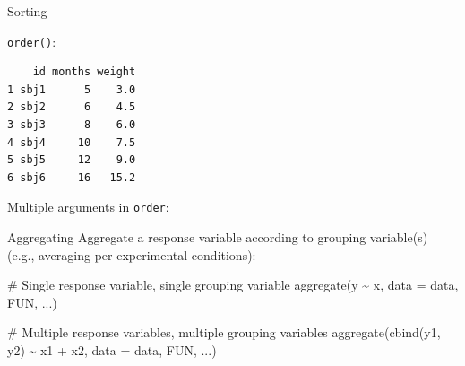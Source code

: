 \documentclass[
  ignorenonframetext,
]{beamer}
\newenvironment{Shaded}{\begin{snugshade}}{\end{snugshade}}
\newcommand{\AttributeTok}[1]{\textcolor[rgb]{0.00,0.34,0.68}{#1}}
\newcommand{\CommentTok}[1]{\textcolor[rgb]{0.54,0.53,0.53}{#1}}
\newcommand{\ConstantTok}[1]{\textcolor[rgb]{0.67,0.33,0.00}{#1}}
\newcommand{\FunctionTok}[1]{\textcolor[rgb]{0.39,0.29,0.61}{#1}}
\newcommand{\NormalTok}[1]{\textcolor[rgb]{0.12,0.11,0.11}{#1}}
\newcommand{\SpecialCharTok}[1]{\textcolor[rgb]{0.24,0.68,0.91}{#1}}
\begin{document}
\begin{frame}[fragile]{Sorting}
\protect\hypertarget{sorting}{}
\small

\texttt{order()}:

\begin{Shaded}
\end{Shaded}

\begin{verbatim}
    id months weight
1 sbj1      5    3.0
2 sbj2      6    4.5
3 sbj3      8    6.0
4 sbj4     10    7.5
5 sbj5     12    9.0
6 sbj6     16   15.2
\end{verbatim}

\begin{Shaded}
\end{Shaded}

Multiple arguments in \texttt{order}:

\begin{Shaded}
\end{Shaded}
\end{frame}

\begin{frame}[fragile]{Aggregating}
\protect\hypertarget{aggregating}{}
Aggregate a response variable according to grouping variable(s) (e.g.,
averaging per experimental conditions):

\begin{Shaded}
\begin{Highlighting}[]
\CommentTok{\# Single response variable, single grouping variable}
\FunctionTok{aggregate}\NormalTok{(y }\SpecialCharTok{\textasciitilde{}}\NormalTok{ x, }\AttributeTok{data =}\NormalTok{ data, FUN, ...)}

\CommentTok{\# Multiple response variables, multiple grouping variables}
\FunctionTok{aggregate}\NormalTok{(}\FunctionTok{cbind}\NormalTok{(y1, y2) }\SpecialCharTok{\textasciitilde{}}\NormalTok{ x1 }\SpecialCharTok{+}\NormalTok{ x2, }\AttributeTok{data =}\NormalTok{ data, FUN, ...)}
\end{Highlighting}
\end{Shaded}
\end{frame}
\end{document}
